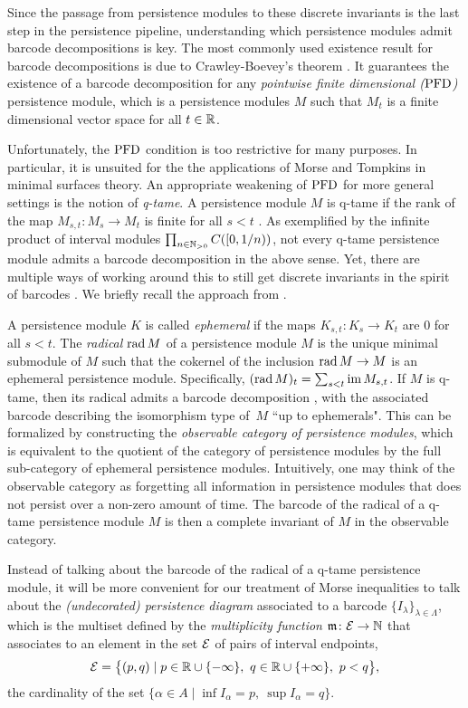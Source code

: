 Since the passage from persistence modules to these discrete invariants is the last step in the persistence pipeline, understanding which persistence modules admit barcode decompositions is key.
The most commonly used existence result for barcode decompositions is due to Crawley-Boevey's theorem \cite{Crawley-Boevey.2015}.
It guarantees the existence of a barcode decomposition for any \emph{pointwise finite dimensional ($\mathrm{PFD}$)} persistence module, which is a persistence modules $M$ such that $M_t$ is a finite dimensional vector space for all $t \in \mathbb{R}$.

Unfortunately, the $\mathrm{PFD}$ condition is too restrictive for many purposes.
In particular, it is unsuited for the the applications of Morse and Tompkins in minimal surfaces theory.
An appropriate weakening of $\mathrm{PFD}$ for more general settings is the notion of \emph{q-tame}.
A persistence module $M$ is q-tame if the rank of the map $M_{s,t} \colon M_s \to M_t$ is finite for all $s < t$ \cite{Chazal.2016a}.
As exemplified by the infinite product of interval modules $\prod_{n \in \mathbb{N}_{> 0}} C([0,1/n))$, not every q-tame persistence module admits a barcode decomposition in the above sense.
Yet, there are multiple ways of working around this to still get discrete invariants in the spirit of barcodes \cite{Chazal.2016a, Chazal.2016b, schmahl2020structure}.
We briefly recall the approach from \citet{Chazal.2016b}.

A persistence module $K$ is called \emph{ephemeral} if the maps $K_{s,t} \colon K_s \to K_t$ are $0$ for all $s < t$.
The \emph{radical} $\operatorname{rad} M$ of a persistence module $M$ is the unique minimal submodule of $M$ such that the cokernel of the inclusion $\operatorname{rad} M \to M$ is an ephemeral persistence module.
Specifically, $(\operatorname{rad} M)_t = \sum_{s<t}\operatorname{im} M_{s,t}$.
If $M$ is q-tame, then its radical admits a barcode decomposition \cite[Corollary~3.6]{Chazal.2016b},
with the associated barcode describing the isomorphism type of~$M$ ``up to ephemerals".
This can be formalized by constructing the \emph{observable category of persistence modules}, which is equivalent to the quotient of the category of persistence modules by the full sub-category of ephemeral persistence modules.
Intuitively, one may think of the observable category as forgetting all information in persistence modules that does not persist over a non-zero amount of time.
The barcode of the radical of a q-tame persistence module $M$ is then a complete invariant of $M$ in the observable category.

Instead of talking about the barcode of the radical of a q-tame persistence module, it will be more convenient for our treatment of Morse inequalities to talk about the \emph{(undecorated) persistence diagram} associated to a barcode $\{I_{\lambda}\}_{\lambda \in \Lambda}$, which is the multiset defined by the \emph{multiplicity function} $\mathfrak{m} \colon \mathcal{E} \to \mathbb{N}$ that associates to an element in the set $\mathcal{E}$ of pairs of interval endpoints,
\[
\mathcal{E} =
\big\{ (p,q) \mid p \in \mathbb{R} \cup \{-\infty\}, \ q \in \mathbb{R} \cup \{+\infty\}, \ p < q \big\},
\]
the cardinality of the set $\{ \alpha \in A \mid \inf I_{\alpha} = p,\ \sup I_{\alpha} = q\}$.


